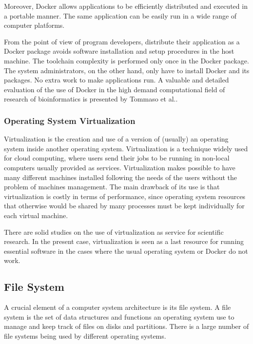 \documentclass[twoside,a4paper,12pt,english]{inac17}
\begin{document}
Moreover, Docker allows applications to be efficiently distributed and executed in a portable manner. The same application can be easily
run in a wide range of computer platforms\cite{Boettiger}.

From the point of view of program developers, distribute their application as a Docker package avoids software installation and
setup procedures in the host machine. The toolchain complexity is performed only once in the Docker package. The system administrators,
on the other hand, only have to install Docker and its packages. No extra work to make applications run. A valuable and detailed evaluation
of the use of Docker in the high demand computational field of research of bioinformatics is presented by Tommaso et al.\cite{Tommaso}.

\subsubsection{Operating System Virtualization}
\label{ssub:virt}

Virtualization is the creation and use of a version of (usually) an operating system inside another operating system. Virtualization
is a technique widely used for cloud computing, where users send their jobs to be running in non-local computers usually provided
as services. Virtualization makes possible to have many different machines installed following the needs of the users without the
problem of machines management. The main drawback of its use is that virtualization is costly in terms of performance, since operating system
resources that otherwise would be shared by many processes must be kept individually for each virtual machine.

There are solid studies on the use of virtualization as service for scientific research\cite{vir1,vir2}. In the present case, virtualization
is seen as a last resource for running essential software in the cases where the usual operating system or Docker do not work.

\subsection{File System}

A crucial element of a computer system architecture is its file system. A file system is the set of data structures and functions an operating system
use to manage and keep track of files on disks and partitions. There is a large number of file systems being used by different operating systems\cite{linuxbook}.
\end{document}
